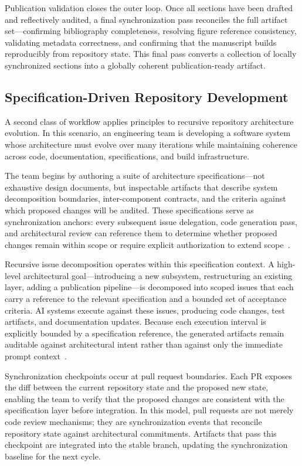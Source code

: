 Publication validation closes the outer loop. Once all sections have been drafted and reflectively audited, a final synchronization pass reconciles the full artifact set---confirming bibliography completeness, resolving figure reference consistency, validating metadata correctness, and confirming that the manuscript builds reproducibly from repository state. This final pass converts a collection of locally synchronized sections into a globally coherent publication-ready artifact.

\subsection{Specification-Driven Repository Development}

A second class of workflow applies  principles to recursive repository architecture evolution. In this scenario, an engineering team is developing a software system whose architecture must evolve over many iterations while maintaining coherence across code, documentation, specifications, and build infrastructure.

The team begins by authoring a suite of architecture specifications---not exhaustive design documents, but inspectable artifacts that describe system decomposition boundaries, inter-component contracts, and the criteria against which proposed changes will be audited. These specifications serve as synchronization anchors: every subsequent issue delegation, code generation pass, and architectural review can reference them to determine whether proposed changes remain within scope or require explicit authorization to extend scope~\cite{Parnas1972Modularization,Chandy1985DistributedSnapshots}.

Recursive issue decomposition operates within this specification context. A high-level architectural goal---introducing a new subsystem, restructuring an existing layer, adding a publication pipeline---is decomposed into scoped issues that each carry a reference to the relevant specification and a bounded set of acceptance criteria. AI systems execute against these issues, producing code changes, test artifacts, and documentation updates. Because each execution interval is explicitly bounded by a specification reference, the generated artifacts remain auditable against architectural intent rather than against only the immediate prompt context~\cite{Yang2024SWEAgent}.

Synchronization checkpoints occur at pull request boundaries. Each PR exposes the diff between the current repository state and the proposed new state, enabling the team to verify that the proposed changes are consistent with the specification layer before integration. In this model, pull requests are not merely code review mechanisms; they are synchronization events that reconcile repository state against architectural commitments. Artifacts that pass this checkpoint are integrated into the stable branch, updating the synchronization baseline for the next cycle.

